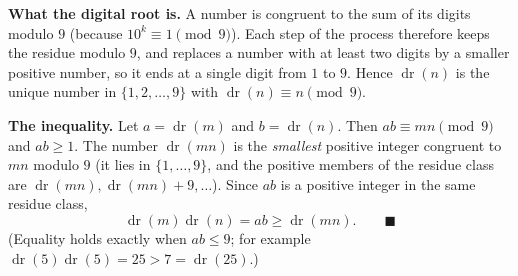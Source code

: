 \textbf{What the digital root is.} A number is congruent to the sum of its digits modulo $9$ (because $10^k\equiv1\pmod9$). Each step of the process therefore keeps the residue modulo $9$, and replaces a number with at least two digits by a smaller positive number, so it ends at a single digit from $1$ to $9$. Hence $\operatorname{dr}(n)$ is the unique number in $\{1,2,\dots,9\}$ with $\operatorname{dr}(n)\equiv n\pmod9$.

\textbf{The inequality.} Let $a=\operatorname{dr}(m)$ and $b=\operatorname{dr}(n)$. Then $ab\equiv mn\pmod 9$ and $ab\ge1$. The number $\operatorname{dr}(mn)$ is the \emph{smallest} positive integer congruent to $mn$ modulo $9$ (it lies in $\{1,\dots,9\}$, and the positive members of the residue class are $\operatorname{dr}(mn),\operatorname{dr}(mn)+9,\dots$). Since $ab$ is a positive integer in the same residue class,
\[
\operatorname{dr}(m)\operatorname{dr}(n)=ab\ge\operatorname{dr}(mn). \qquad\blacksquare
\]
(Equality holds exactly when $ab\le9$; for example $\operatorname{dr}(5)\operatorname{dr}(5)=25>7=\operatorname{dr}(25)$.)
